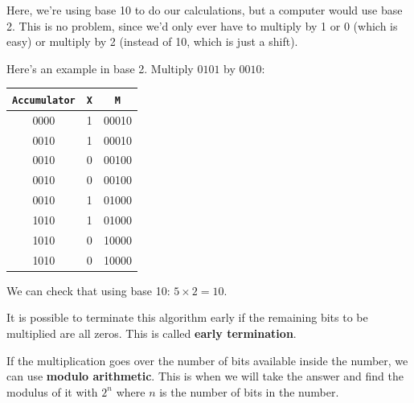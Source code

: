 Here, we're using base 10 to do our calculations, but a computer would use base
2. This is no problem, since we'd only ever have to multiply by 1 or 0 (which is
easy) or multiply by 2 (instead of 10, which is just a shift).

Here's an example in base 2. Multiply $0101$ by $0010$:

\begin{center}
	\begin{tabular}{c c c}
		{\tt Accumulator} & {\tt X} & {\tt M}\\ \hline
		0000 & 1 & 00010\\
		0010 & 1 & 00010\\
		0010 & 0 & 00100\\
		0010 & 0 & 00100\\
		0010 & 1 & 01000\\
		1010 & 1 & 01000\\
		1010 & 0 & 10000\\
		1010 & 0 & 10000\\
	\end{tabular}
\end{center}

We can check that using base 10: $5 \times 2 = 10$.

It is possible to terminate this algorithm early if the remaining bits to be
multiplied are all zeros. This is called {\bf early termination}.

If the multiplication goes over the number of bits available inside the number,
we can use {\bf modulo arithmetic}. This is when we will take the answer and
find the modulus of it with $2^n$ where $n$ is the number of bits in the number.

